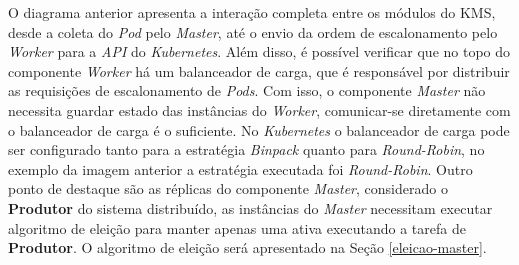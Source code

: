 O diagrama anterior apresenta a interação completa entre os módulos do \ac{KMS}, desde a coleta do \textit{Pod} pelo \textit{Master}, até o envio da ordem de escalonamento pelo \textit{Worker} para a \textit{API} do \textit{Kubernetes}. Além disso, é possível verificar que no topo do componente \textit{Worker} há um balanceador de carga, que é responsável por distribuir as requisições de escalonamento de \textit{Pods}. Com isso, o componente \textit{Master} não necessita guardar estado das instâncias do \textit{Worker}, comunicar-se diretamente com o balanceador de carga é o suficiente. No \textit{Kubernetes} o balanceador de carga pode ser configurado tanto para a estratégia \textit{Binpack} quanto para \textit{Round-Robin}, no exemplo da imagem anterior a estratégia executada foi \textit{Round-Robin}. Outro ponto de destaque são as réplicas do componente \textit{Master}, considerado o \textbf{Produtor} do sistema distribuído, as instâncias do \textit{Master} necessitam executar algoritmo de eleição para manter apenas uma ativa executando a tarefa de \textbf{Produtor}. O algoritmo de eleição será apresentado na Seção \ref{eleicao-master}.



